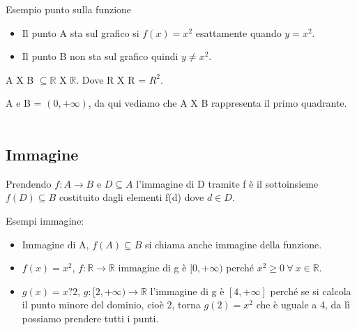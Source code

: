 \begin{example}
Esempio punto sulla funzione
\begin{itemize}
    \item Il punto A sta sul grafico si $f(x) = x^2$ esattamente quando $y = x^2$.
    \item Il punto B non sta sul grafico quindi $y \neq x^2$.
\end{itemize}
\end{example}
\begin{note}
    A X B $\subseteq \mathbb{R}$ X $\mathbb{R}$. Dove R X R = $R^2$.
\end{note}
\begin{example}
A e B = $(0, +\infty)$, da qui vediamo che A X B rappresenta il primo quadrante.\\\\
\end{example}

\subsection{Immagine}
\begin{definition}[Immagine]
Prendendo $f: A \longrightarrow B$ e $D \subseteq A$ l'immagine di D tramite f è il sottoinsieme $f(D) \subseteq B$ costituito dagli elementi f(d) dove $d \in D$.
\end{definition}
\begin{example}
    Esempi immagine:
    \begin{itemize}
        \item Immagine di A, $f(A) \subseteq B$ si chiama anche immagine della funzione.
        \item $f(x) = x^2$, $f: \mathbb{R} \longrightarrow \mathbb{R}$ \hspace{.2cm} immagine di g è $[0, +\infty)$ perché $x^2 \geq 0 \: \forall \: x \in \mathbb{R}$.
        \item $g(x) = x?2$, $g:[2, +\infty) \longrightarrow \mathbb{R}$ \hspace{.2cm} l'immagine di g è $[4, +\infty]$ perché se si calcola il punto minore del dominio, cioè 2, torna $g(2) = x^2$ che è uguale a 4, da lì possiamo prendere tutti i punti.
    \end{itemize}
\end{example}

